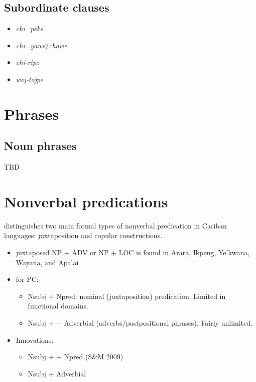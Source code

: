 \documentclass{memoir}
\begin{document}
\section{Subordinate clauses}

\begin{itemize}
\tightlist
\item
  \emph{chi=pëkë}
\item
  \emph{chi=yawë}/\emph{chawë}
\item
  \emph{chi-ripo}
\item
  \emph{wej-tojpe}
\end{itemize}

\chapter{\texorpdfstring{Phrases \label{phrases}}{Phrases }}

\section{\texorpdfstring{Noun phrases
\label{sec:nounphrases}}{Noun phrases }}

TBD

\chapter{\texorpdfstring{Nonverbal predications
\label{nonverbal}}{Nonverbal predications }}

\textcites[366]{gildea2018reconstructing} distinguishes two main formal
types of nonverbal predication in Cariban languages: juxtaposition and
copular constructions.

\begin{itemize}
\tightlist
\item
  juxtaposed NP + ADV or NP + LOC is found in Arara, Ikpeng, Ye'kwana,
  Wayana, and Apalaí
\item
  for PC:

  \begin{itemize}
  \tightlist
  \item
    Nsubj + Npred: nominal (juxtaposition) predication. Limited in
    functional domains.
  \item
    Nsubj +  + Adverbial (adverbs/postpositional phrases).
    Fairly unlimited.
  \end{itemize}
\item
  Innovations:

  \begin{itemize}
  \tightlist
  \item
    Nsubj +  + Npred (S\&M 2009)
  \item
    Nsubj + Adverbial
  \end{itemize}
\end{itemize}
\end{document}
